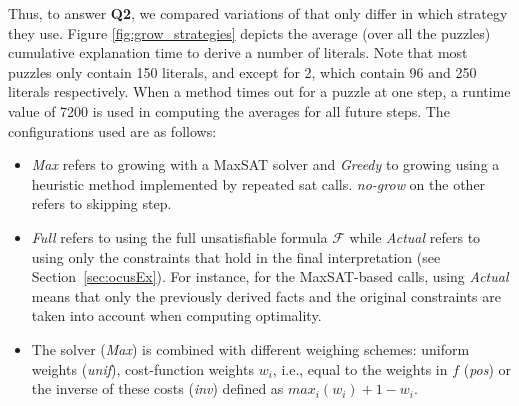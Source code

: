 Thus, to answer \textbf{Q2}, we compared variations of  \comus that only differ in which \grow strategy they use. 
Figure \ref{fig:grow_strategies} depicts the average (over all the puzzles) cumulative explanation time to derive a number of literals. Note that most puzzles only contain 150 literals, and except for 2, which contain 96 and 250 literals respectively. When a method times out for a puzzle at one step, a runtime value of 7200 is used in computing the averages for all future steps.
The configurations used are as follows:
\begin{itemize}
\item \emph{Max} refers to growing with a MaxSAT solver and \emph{Greedy} to growing using a heuristic method implemented by repeated sat calls. 
\emph{no-grow} on the other refers to skipping \grow step.
\item  \emph{Full} refers to using the full unsatisfiable formula $\mathcal{F}$  while \emph{Actual} refers to using only the constraints that hold in the final interpretation (see Section~\ref{sec:ocusEx}). For instance, for the MaxSAT-based calls, using \emph{Actual} means that only the previously derived facts and the original constraints are taken into account when computing optimality. 
\item The \maxsat solver (\emph{Max}) is combined with different weighing schemes: uniform weights (\emph{unif}), cost-function weights $w_i$, i.e., equal to the weights in $f$ (\emph{pos}) or the inverse of these costs (\emph{inv}) defined as $max_i(w_i) + 1 - w_i$.%
\end{itemize}


